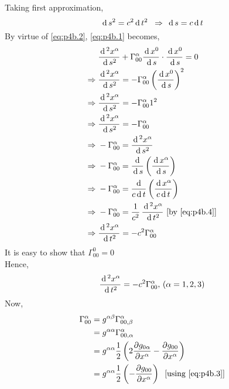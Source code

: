 \documentclass[../main-sheet.tex]{subfiles}
\begin{document}
\begin{soln}
            Taking first approximation,
            \begin{equation}
                \,\mathrm{d}\, s^2=c^2\,\mathrm{d}\, t^2\;\;\Rightarrow\;\,\mathrm{d}\, s=c\,\mathrm{d}\, t \label{eq:p4b.4}
            \end{equation}
            By virtue of \eqref{eq:p4b.2}, \eqref{eq:p4b.1} becomes,
            \begin{align*}
                & \frac{\,\mathrm{d}\,^2 x^\alpha}{\,\mathrm{d}\, s^2}+\Gamma_{00}^\alpha \frac{\,\mathrm{d}\, x^0}{\,\mathrm{d}\, s}\cdot \frac{\,\mathrm{d}\, x^0}{\,\mathrm{d}\, s}=0\\
                \Rightarrow\;& \frac{\,\mathrm{d}\,^2 x^\alpha}{\,\mathrm{d}\, s^2}=-\Gamma_{00}^\alpha \left(\frac{\,\mathrm{d}\, x^0}{\,\mathrm{d}\, s}\right)^2\\
                \Rightarrow\;& \frac{\,\mathrm{d}\,^2 x^\alpha}{\,\mathrm{d}\, s^2}=-\Gamma_{00}^\alpha 1^2\\
                \Rightarrow\;& \frac{\,\mathrm{d}\,^2 x^\alpha}{\,\mathrm{d}\, s^2}=-\Gamma_{00}^\alpha\\
                \Rightarrow\;& -\Gamma_{00}^\alpha=\frac{\,\mathrm{d}\,^2 x^\alpha}{\,\mathrm{d}\, s^2}\\
                \Rightarrow\;& -\Gamma_{00}^\alpha=\frac{\,\mathrm{d}\,}{\,\mathrm{d}\, s}\left(\frac{\,\mathrm{d}\, x^\alpha}{\,\mathrm{d}\, s}\right)\\
                \Rightarrow\;& -\Gamma_{00}^\alpha=\frac{\,\mathrm{d}\,}{c\,\mathrm{d}\, t}\left(\frac{\,\mathrm{d}\, x^\alpha}{c \,\mathrm{d}\, t}\right)\\
                \Rightarrow\;& -\Gamma_{00}^\alpha=\frac{1}{c^2}\,\frac{\,\mathrm{d}\,^2 x^\alpha}{\,\mathrm{d}\, t^2}\,\,[\text{by \eqref{eq:p4b.4}}]\\
                \Rightarrow\;&\frac{\,\mathrm{d}\,^2 x^\alpha}{\,\mathrm{d}\, t^2}= -c^2\Gamma_{00}^\alpha
            \end{align*}
            It is easy to show that \(\Gamma_{00}^0=0\)\\
            Hence,
            \begin{equation}
                \frac{\,\mathrm{d}\,^2 x^\alpha}{\,\mathrm{d}\, t^2}= -c^2\Gamma_{00}^\alpha,\,(\alpha=1,2,3)
                \label{eq:p4b.5}
            \end{equation}
            Now,
            \begin{align*}
                \Gamma_{00}^\alpha&=g^{\alpha\beta}\Gamma_{00,\beta}^\alpha\\
                &=g^{\alpha\alpha}\Gamma_{00,\alpha}^\alpha\\
                &=g^{\alpha\alpha}\frac{1}{2}\left( 2\frac{\partial g_{0\alpha}}{\partial x^\alpha}-\frac{\partial g_{00}}{\partial x^\alpha} \right)\\
                &=g^{\alpha\alpha}\frac{1}{2}\left( -\frac{\partial g_{00}}{\partial x^\alpha}\right)\;\;\text{[using \eqref{eq:p4b.3}]}\\

\end{align*}
\end{soln}
\end{document}

